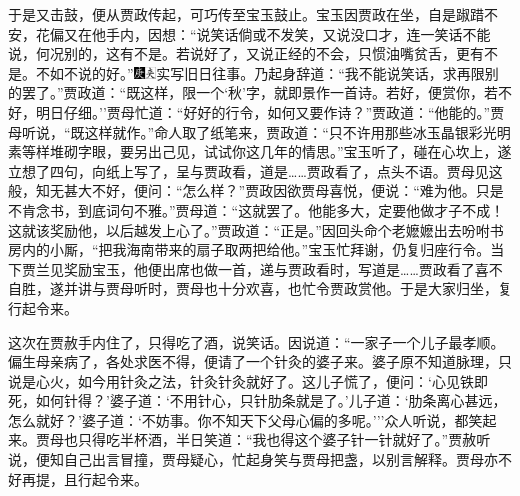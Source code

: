 于是又击鼓，便从贾政传起，可巧传至宝玉鼓止。宝玉因贾政在坐，自是踧踖不安，花偏又在他手内，因想：``说笑话倘或不发笑，又说没口才，连一笑话不能说，何况别的，这有不是。若说好了，又说正经的不会，只惯油嘴贫舌，更有不是。不如不说的好。''{\includegraphics[width=3mm]{../Images/00004}\includegraphics[width=3mm]{../Images/00012}\footnotesize \kaishu 实写旧日往事。}乃起身辞道：``我不能说笑话，求再限别的罢了。''贾政道：``既这样，限一个`秋'字，就即景作一首诗。若好，便赏你，若不好，明日仔细。''贾母忙道：``好好的行令，如何又要作诗？''贾政道：``他能的。''贾母听说，``既这样就作。''命人取了纸笔来，贾政道：``只不许用那些冰玉晶银彩光明素等样堆砌字眼，要另出己见，试试你这几年的情思。''宝玉听了，碰在心坎上，遂立想了四句，向纸上写了，呈与贾政看，道是\ldots{}\ldots{}贾政看了，点头不语。贾母见这般，知无甚大不好，便问：``怎么样？''贾政因欲贾母喜悦，便说：``难为他。只是不肯念书，到底词句不雅。''贾母道：``这就罢了。他能多大，定要他做才子不成！这就该奖励他，以后越发上心了。''贾政道：``正是。''因回头命个老嬷嬷出去吩咐书房内的小厮，``把我海南带来的扇子取两把给他。''宝玉忙拜谢，仍复归座行令。当下贾兰见奖励宝玉，他便出席也做一首，递与贾政看时，写道是\ldots{}\ldots{}贾政看了喜不自胜，遂并讲与贾母听时，贾母也十分欢喜，也忙令贾政赏他。于是大家归坐，复行起令来。

这次在贾赦手内住了，只得吃了酒，说笑话。因说道：``一家子一个儿子最孝顺。偏生母亲病了，各处求医不得，便请了一个针灸的婆子来。婆子原不知道脉理，只说是心火，如今用针灸之法，针灸针灸就好了。这儿子慌了，便问：`心见铁即死，如何针得？'婆子道：`不用针心，只针肋条就是了。'儿子道：`肋条离心甚远，怎么就好？'婆子道：`不妨事。你不知天下父母心偏的多呢。'''众人听说，都笑起来。贾母也只得吃半杯酒，半日笑道：``我也得这个婆子针一针就好了。''贾赦听说，便知自己出言冒撞，贾母疑心，忙起身笑与贾母把盏，以别言解释。贾母亦不好再提，且行起令来。

